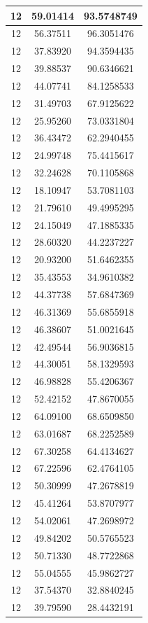 \documentclass[
]{book}
\begin{document}
\begin{tabular}{c|c|c}
\hline
12 & 59.01414 & 93.5748749\\
\hline
12 & 56.37511 & 96.3051476\\
\hline
12 & 37.83920 & 94.3594435\\
\hline
12 & 39.88537 & 90.6346621\\
\hline
12 & 44.07741 & 84.1258533\\
\hline
12 & 31.49703 & 67.9125622\\
\hline
12 & 25.95260 & 73.0331804\\
\hline
12 & 36.43472 & 62.2940455\\
\hline
12 & 24.99748 & 75.4415617\\
\hline
12 & 32.24628 & 70.1105868\\
\hline
12 & 18.10947 & 53.7081103\\
\hline
12 & 21.79610 & 49.4995295\\
\hline
12 & 24.15049 & 47.1885335\\
\hline
12 & 28.60320 & 44.2237227\\
\hline
12 & 20.93200 & 51.6462355\\
\hline
12 & 35.43553 & 34.9610382\\
\hline
12 & 44.37738 & 57.6847369\\
\hline
12 & 46.31369 & 55.6855918\\
\hline
12 & 46.38607 & 51.0021645\\
\hline
12 & 42.49544 & 56.9036815\\
\hline
12 & 44.30051 & 58.1329593\\
\hline
12 & 46.98828 & 55.4206367\\
\hline
12 & 52.42152 & 47.8670055\\
\hline
12 & 64.09100 & 68.6509850\\
\hline
12 & 63.01687 & 68.2252589\\
\hline
12 & 67.30258 & 64.4134627\\
\hline
12 & 67.22596 & 62.4764105\\
\hline
12 & 50.30999 & 47.2678819\\
\hline
12 & 45.41264 & 53.8707977\\
\hline
12 & 54.02061 & 47.2698972\\
\hline
12 & 49.84202 & 50.5765523\\
\hline
12 & 50.71330 & 48.7722868\\
\hline
12 & 55.04555 & 45.9862727\\
\hline
12 & 37.54370 & 32.8840245\\
\hline
12 & 39.79590 & 28.4432191\\

\end{tabular}
\end{document}
